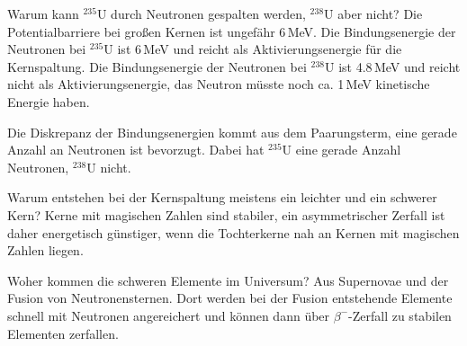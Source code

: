
\begin{fquestion}{Warum kann ${}^{235}\mathrm{U}$ durch Neutronen gespalten werden, ${}^{238}\mathrm{U}$ aber nicht?}
    Die Potentialbarriere bei großen Kernen ist ungefähr 6\,MeV. 
    Die Bindungsenergie der Neutronen bei ${}^{235}\mathrm{U}$ ist 6\,MeV und reicht als Aktivierungsenergie für die Kernspaltung. 
    Die Bindungsenergie der Neutronen bei ${}^{238}\mathrm{U}$ ist 4.8\,MeV und reicht nicht als Aktivierungsenergie, das Neutron müsste noch ca. 1\,MeV kinetische Energie haben.  
    
    Die Diskrepanz der Bindungsenergien kommt aus dem Paarungsterm, eine gerade Anzahl an Neutronen ist bevorzugt.
    Dabei hat ${}^{235}\mathrm{U}$ eine gerade Anzahl Neutronen, ${}^{238}\mathrm{U}$ nicht.
    
\end{fquestion}

\begin{fquestion}{Warum entstehen bei der Kernspaltung meistens ein leichter und ein schwerer Kern?}
    Kerne mit magischen Zahlen sind stabiler, ein asymmetrischer Zerfall ist daher energetisch günstiger, wenn die Tochterkerne nah an Kernen mit magischen Zahlen liegen. 
\end{fquestion}

\begin{fquestion}{Woher kommen die schweren Elemente im Universum?}
    Aus Supernovae und der Fusion von Neutronensternen.
    Dort werden bei der Fusion entstehende Elemente schnell mit Neutronen angereichert und können dann über $\beta^-$-Zerfall zu stabilen Elementen zerfallen.  
\end{fquestion}

